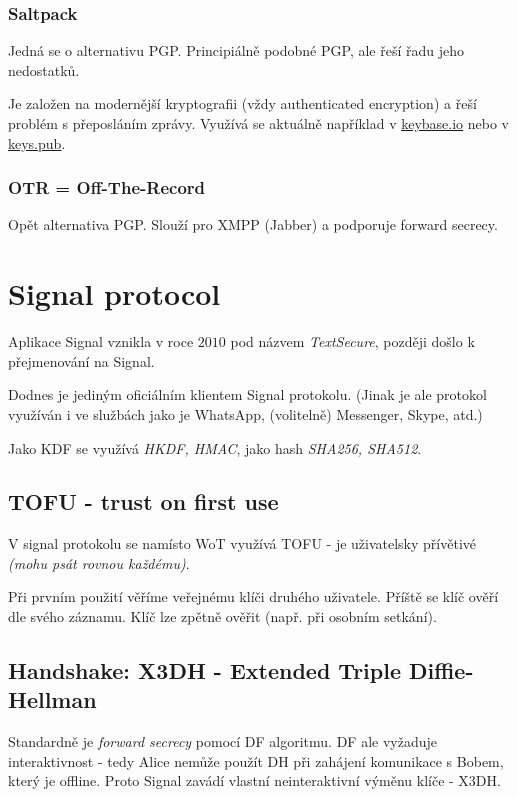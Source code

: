 \documentclass[10pt,a4paper]{article}
\begin{document}
\subsubsection*{Saltpack}
Jedná se o alternativu PGP. Principiálně podobné PGP, ale řeší řadu jeho nedostatků.

Je založen na modernější kryptografii (vždy authenticated encryption) a řeší problém s přeposláním zprávy.
Využívá se aktuálně například v \href{keybase.io}{keybase.io} nebo v \href{keys.pub}{keys.pub}.


\subsubsection*{OTR = Off-The-Record}

Opět alternativa PGP. Slouží pro XMPP (Jabber) a podporuje forward secrecy. 

\section{Signal protocol}

Aplikace Signal vznikla v roce $ 2010 $ pod názvem \textit{TextSecure}, později došlo k přejmenování na Signal.

Dodnes je jediným oficiálním klientem Signal protokolu. 
(Jinak je ale protokol využíván i ve službách jako je WhatsApp, (volitelně) Messenger, Skype, atd.)

Jako KDF se využívá \textit{HKDF, HMAC}, jako hash \textit{SHA256, SHA512}.

\subsection{TOFU - trust on first use}

V signal protokolu se namísto WoT využívá TOFU - je uživatelsky přívětivé \textit{(mohu psát rovnou každému)}.

Při prvním použití věříme veřejnému klíči druhého uživatele.
Příště se klíč ověří dle svého záznamu.
Klíč lze zpětně ověřit (např. při osobním setkání).

\subsection{Handshake: X3DH - Extended Triple Diffie-Hellman}
Standardně je \textit{forward secrecy} pomocí DF algoritmu.
DF ale vyžaduje interaktivnost - tedy Alice nemůže použít DH při zahájení komunikace s Bobem, který je offline.
Proto Signal zavádí vlastní neinteraktivní výměnu klíče - X3DH.
\end{document}
